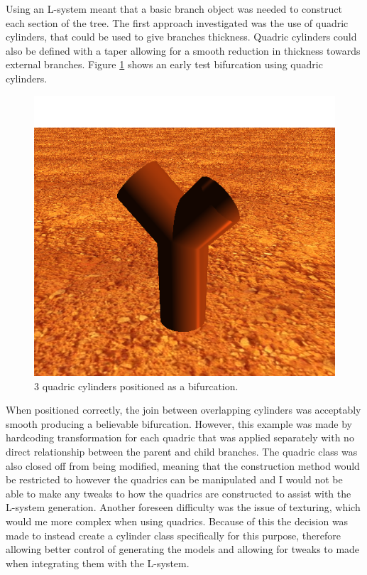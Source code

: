 \documentclass[final]{cmpreport}
\begin{document}
Using an L-system meant that a basic branch object was needed to construct each section of the 
tree. The first approach investigated was the use of quadric cylinders, that could be 
used to give branches thickness. Quadric cylinders could also be defined with a taper allowing 
for a smooth reduction in thickness towards external branches. Figure \ref{fig:quadric-cylinders} shows 
an early test bifurcation using quadric cylinders.

\begin{figure}[ht]
    \includegraphics[scale=0.5]{quadric-cylinders.png} 
    \centering
    \captionsetup{justification=centering}
    \caption{3 quadric cylinders positioned as a bifurcation.}
    \label{fig:quadric-cylinders}
\end{figure}

When positioned correctly, the join between 
overlapping cylinders was acceptably smooth producing a believable bifurcation. However, this 
example was made by hardcoding transformation for each quadric that was applied separately with 
no direct relationship between the parent and child branches. The quadric class was also closed 
off from being modified, meaning that the construction method would be restricted to however the 
quadrics can be manipulated and I would not be able to make any tweaks to how the quadrics are 
constructed to assist with the L-system generation. Another foreseen difficulty was the issue of
texturing, which would me more complex when using quadrics.
Because of this the decision was made to instead create a cylinder class specifically for this 
purpose, therefore allowing better control of generating the models and allowing for tweaks to 
made when integrating them with the L-system. 
\end{document}
